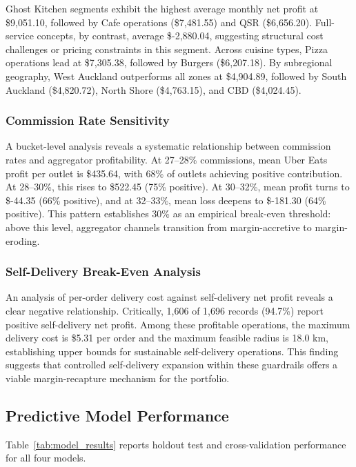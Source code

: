 \documentclass[10pt,a4paper,twocolumn]{article}
\begin{document}
Ghost Kitchen segments exhibit the highest average monthly net profit at \$9{,}051.10,
followed by Cafe operations (\$7{,}481.55) and QSR (\$6{,}656.20). Full-service concepts,
by contrast, average \$-2{,}880.04, suggesting structural cost challenges or pricing
constraints in this segment. Across cuisine types, Pizza operations lead at \$7{,}305.38,
followed by Burgers (\$6{,}207.18). By subregional geography, West Auckland outperforms
all zones at \$4{,}904.89, followed by South Auckland (\$4{,}820.72), North Shore
(\$4{,}763.15), and CBD (\$4{,}024.45).

\subsubsection{Commission Rate Sensitivity}

A bucket-level analysis reveals a systematic relationship between commission rates and
aggregator profitability. At 27--28\% commissions, mean Uber Eats profit per outlet
is \$435.64, with 68\% of outlets achieving positive contribution. At 28--30\%, this
rises to \$522.45 (75\% positive). At 30--32\%, mean profit turns to \$-44.35 (66\%
positive), and at 32--33\%, mean loss deepens to \$-181.30 (64\% positive). This pattern
establishes 30\% as an empirical break-even threshold: above this level, aggregator
channels transition from margin-accretive to margin-eroding.

\subsubsection{Self-Delivery Break-Even Analysis}

An analysis of per-order delivery cost against self-delivery net profit reveals a clear
negative relationship. Critically, 1{,}606 of 1{,}696 records (94.7\%) report positive
self-delivery net profit. Among these profitable operations, the maximum delivery cost
is \$5.31 per order and the maximum feasible radius is 18.0 km, establishing upper
bounds for sustainable self-delivery operations. This finding suggests that controlled
self-delivery expansion within these guardrails offers a viable margin-recapture
mechanism for the portfolio.

\subsection{Predictive Model Performance}

Table~\ref{tab:model_results} reports holdout test and cross-validation performance
for all four models.
\end{document}
